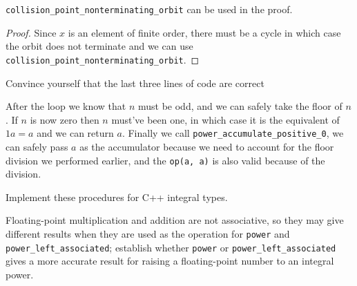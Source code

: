 \begin{lemma}
	\verb|collision_point_nonterminating_orbit| can be used in the proof.
\end{lemma}

\begin{proof}
	Since $x$ is an element of finite order, there must be a cycle in which case the orbit
	does not terminate and we can use \verb|collision_point_nonterminating_orbit|.
\end{proof}

\begin{exercise}
	Convince yourself that the last three lines of code are correct
\end{exercise}

\begin{solution}
	After the loop we know that $n$ must be odd, and we can safely take the
	floor of $n$. If $n$ is now zero then $n$ must've been one, in which case it is the
	equivalent of $1a = a$ and we can return $a$. Finally we call \verb|power_accumulate_positive_0|,
	we can safely pass $a$ as the accumulator because we need to account for the floor division
	we performed earlier, and the \verb|op(a, a)| is also valid because of the division.
\end{solution}

\begin{exercise}
	Implement these procedures for C++ integral types.
\end{exercise}



\begin{project}
	Floating-point multiplication and addition are not associative, so they may give different
	results when they are used as the operation for \verb|power| and \verb|power_left_associated|;
	establish whether \verb|power| or \verb|power_left_associated| gives a more accurate result
	for raising a floating-point number to an integral power.
\end{project}
